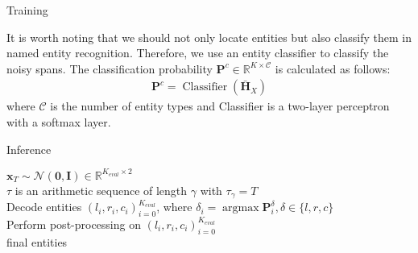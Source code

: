\documentclass[11pt]{article}
\begin{document}
\begin{algorithm}[t]
\small
 \caption{Training}
 \label{alg:training}
\end{algorithm}


It is worth noting that we should not only locate entities but also classify them in named entity recognition. Therefore, we use an entity classifier to classify the noisy spans. The classification probability $\mathbf{P}^{c} \in \mathbb{R}^{K\times \mathcal{C}}$ is calculated as follows:
\begin{align*}
    \mathbf{P}^{c}=\operatorname{Classifier}(\bar{\mathbf{H}}_{X})
\end{align*}
\noindent where $\mathcal{C}$ is the number of entity types and Classifier is a two-layer perceptron with a softmax layer.





\begin{algorithm}[t]
\small
 \caption{Inference}
 \label{alg:inference}
$\mathbf{x}_T \sim \mathcal{N}(\mathbf{0}, \mathbf{I}) \in \mathbb{R}^{K_{eval}\times 2}$ \\
 $\tau$ is an arithmetic sequence of length $\gamma$ with $\tau_\gamma=T$\\
 Decode entities ${(l_i, r_i, c_i)}^{K_{eval}}_{i=0}$, where $\delta_i = \operatorname{argmax}\mathbf{P}_i^\delta, \delta \in \{l, r, c\}$ \\
Perform post-processing on ${(l_i, r_i, c_i)}^{K_{eval}}_{i=0}$ \\
 \Return final entities
\end{algorithm}
\end{document}
